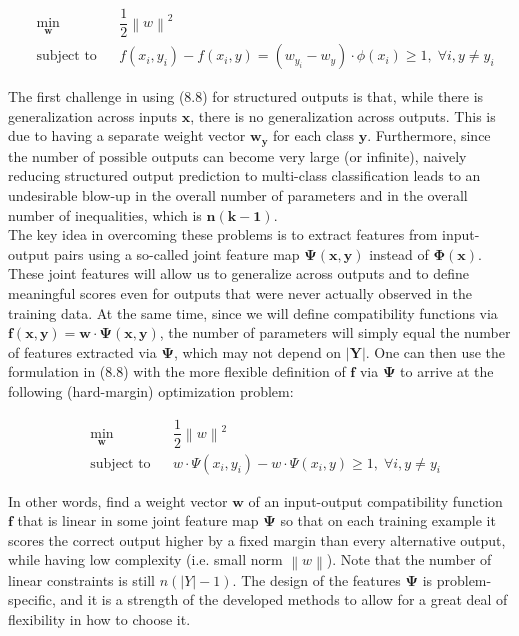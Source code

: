 \documentclass[twoside]{article}
\newcommand{\norm}[1]{\left\lVert #1 \right\rVert}
\begin{document}
\begin{equation}
\begin{aligned}
& \underset{\textbf{w}}{\text{min}}
& & \dfrac{1}{2} \norm{w}^2  \\
& \text{subject to}
& & f(x_{i},y_{i}) - f(x_{i},y) = (w_{y_i} - w_y)\cdot \phi(x_i) \geq 1 , \;\forall i, y \not = y_{i}
\end{aligned}
\end{equation}

The first challenge in using (8.8) for structured outputs is that, while there is generalization across inputs $\mathbf{x}$, there is no generalization across outputs. This is due to having a
separate weight vector $\mathbf{w_y}$ for each class $\mathbf{y}$. Furthermore,
since the number of possible outputs can become very large (or infinite), naively reducing structured output prediction
to multi-class classification leads to an undesirable blow-up
in the overall number of parameters and in the overall number of inequalities, which is $\mathbf{n(k-1)}$. \\

The key idea in overcoming these problems is to extract
features from input-output pairs using a so-called joint feature map $\mathbf{\Psi(x, y)}$ instead of $\mathbf{\Phi(x)}$. These joint features will allow us to generalize across outputs and to define meaningful scores even
for outputs that were never actually observed in the training data. At the same time, since we will define compatibility
functions via $\mathbf{f(x, y) = w\cdot \Psi(x, y)}$, the number of parameters will simply equal the number of features extracted via
$\mathbf{\Psi}$, which may not depend on $\mathbf{|Y|}$. One can then use the formulation in (8.8) with the more flexible definition of $\mathbf{f}$ via $\mathbf{\Psi}$ to
arrive at the following (hard-margin) optimization problem:

\begin{equation*}
\begin{aligned}
& \underset{\textbf{w}}{\text{min}}
& & \dfrac{1}{2} \norm{w}^2  \\
& \text{subject to}
& & w \cdot \Psi(x_{i},y_{i}) - w \cdot \Psi(x_{i},y) \geq 1 , \;\forall i, y \not = y_{i}
\end{aligned}
\end{equation*}

In other words, find a weight vector $\mathbf{w}$ of an input-output compatibility function $\mathbf{f}$ that is linear in some joint feature map $\mathbf{\Psi}$
so that on each training example it scores the correct output
higher by a fixed margin than every alternative output, while
having low complexity (i.e. small norm $\norm{w}$). Note that the
number of linear constraints is still $n(|Y| -1)$. The design of the features $\mathbf{\Psi}$ is problem-specific, and it is a
strength of the developed methods to allow for a great deal of flexibility in how to choose it.
\end{document}
